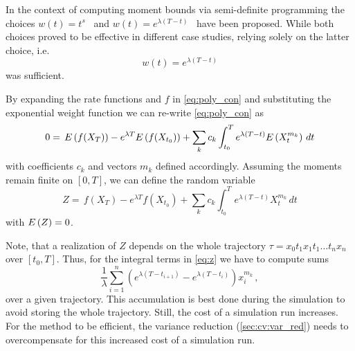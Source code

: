 In the context of computing moment bounds via semi-definite programming
the choices $w(t)=t^s$~\cite{sakurai2019bounding} and $w(t)=e^{\lambda(T - t)}$~\cite{dowdy2018dynamic}
have been proposed.
While both choices proved to be effective in different case studies, relying solely on the latter choice,
i.e.\ $$w(t)=e^{\lambda(T - t)}$$ was sufficient.

By expanding the rate functions and $f$ in \eqref{eq:poly_con} and substituting the
exponential weight function we can re-write \eqref{eq:poly_con} as
\begin{equation}\label{eq:simpl_exp}
        0 =\,
         {E}\left(f(X_{T})\right)
        - e^{\lambda T}{E}\left(f(X_{t_0})\right)
        + \sum_{k}c_k\int_{t_0}^{T}e^{\lambda(T-t)}{E}\left(X_t^{m_k}\right)\,dt
\end{equation}
with coefficients $c_k$ and vectors $m_k$ defined accordingly.
Assuming the moments remain finite on $[0,T]$, we can define the random variable
\begin{equation}\label{eq:z}
        Z =\,
         f(X_{T})
        - e^{\lambda T}f(X_{t_0})
        + \sum_{k}c_k\int_{t_0}^{T}e^{\lambda(T-t)}X_t^{m_k}\,dt
\end{equation}
with ${E}\left(Z\right)=0$.

Note, that a realization of $Z$ depends on the whole trajectory $\tau=x_0t_1 x_1 t_1 \dots\allowbreak t_n x_n$ over $[t_0,T]$.
Thus, for the integral terms
in \eqref{eq:z} we have to compute sums
\begin{equation}\label{eq:dis_int}
    \frac{1}{\lambda}\sum_{i=1}^n\left(e^{\lambda(T - t_{i+1})}
    - e^{\lambda(T-t_i)}\right)x_i^{m_k}\,,
\end{equation}
over a given trajectory.
This accumulation is best done during the simulation to avoid storing the whole trajectory.
Still, the cost of a simulation run increases.
For the method to be efficient, the variance reduction (\autoref{sec:cv:var_red}) needs
to overcompensate for this increased cost of a simulation run.

